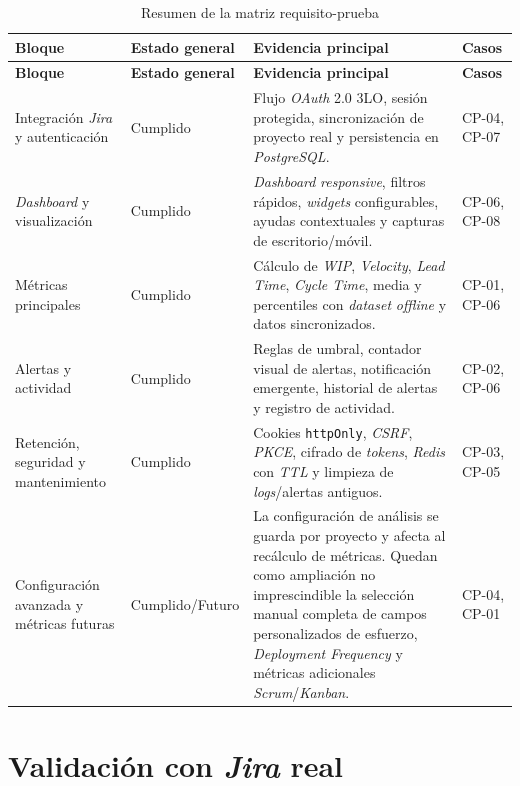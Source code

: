 {\renewcommand{\arraystretch}{1.22}\footnotesize
\begin{longtable}{p{2.65cm}p{2.45cm}p{5.2cm}p{2.35cm}}
\caption{Resumen de la matriz requisito-prueba}\label{tab:resumen-validacion-requisitos}\\
\toprule
\textbf{Bloque} & \textbf{Estado general} & \textbf{Evidencia principal} & \textbf{Casos} \\
\midrule
\endfirsthead
\toprule
\textbf{Bloque} & \textbf{Estado general} & \textbf{Evidencia principal} & \textbf{Casos} \\
\midrule
\endhead
Integración \textit{Jira} y autenticación & Cumplido & Flujo \textit{OAuth} 2.0 3LO, sesión protegida, sincronización de proyecto real y persistencia en \textit{PostgreSQL}. & CP-04, CP-07 \\
\textit{Dashboard} y visualización & Cumplido & \textit{Dashboard} \textit{responsive}, filtros rápidos, \textit{widgets} configurables, ayudas contextuales y capturas de escritorio/móvil. & CP-06, CP-08 \\
Métricas principales & Cumplido & Cálculo de \textit{WIP}, \textit{Velocity}, \textit{Lead Time}, \textit{Cycle Time}, media y percentiles con \textit{dataset} \textit{offline} y datos sincronizados. & CP-01, CP-06 \\
Alertas y actividad & Cumplido & Reglas de umbral, contador visual de alertas, notificación emergente, historial de alertas y registro de actividad. & CP-02, CP-06 \\
Retención, seguridad y mantenimiento & Cumplido & Cookies \texttt{httpOnly}, \textit{CSRF}, \textit{PKCE}, cifrado de \textit{tokens}, \textit{Redis} con \textit{TTL} y limpieza de \textit{logs}/alertas antiguos. & CP-03, CP-05 \\
Configuración avanzada y métricas futuras & Cumplido/Futuro & La configuración de análisis se guarda por proyecto y afecta al recálculo de métricas. Quedan como ampliación no imprescindible la selección manual completa de campos personalizados de esfuerzo, \textit{Deployment Frequency} y métricas adicionales \textit{Scrum}/\textit{Kanban}. & CP-04, CP-01 \\
\bottomrule
\end{longtable}
\vspace{0.45em}
}


\section{Validación con \textit{Jira} real}

